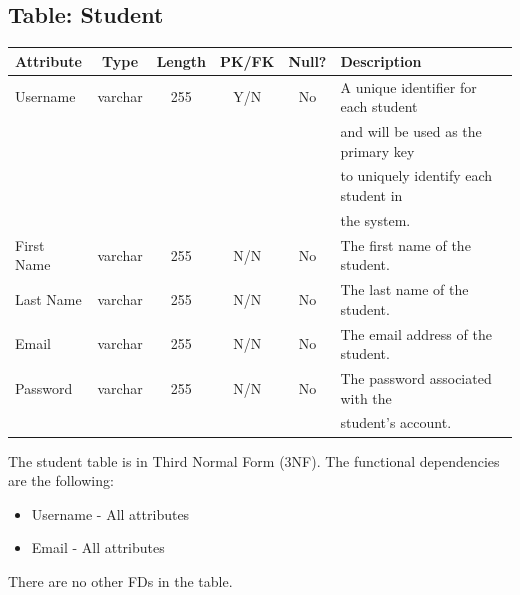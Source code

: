 \documentclass[letterpaper,12pt,oneside,listof=totoc]{scrreprt}
\begin{document}
\subsection{Table: Student}
\begin{table}[h]
    \centering
    \begin{tabular}{|l|c|c|c|c|l|}
        \hline
        \textbf{Attribute} & \textbf{Type} & \textbf{Length} & \textbf{PK/FK} & \textbf{Null?} & \textbf{Description}
        \\
        \hline
         Username & varchar & 255 & Y/N & No & A unique identifier for each student \\ &&&&& and will be used as the primary key \\ &&&&& to uniquely identify each student in \\ &&&&& the system.
        \\
        \hline
        First Name & varchar & 255 & N/N & No & The first name of the student.
        \\
        \hline
        Last Name & varchar & 255 & N/N & No & The last name of the student.
        \\
        \hline
        Email & varchar & 255 & N/N & No & The email address of the student. 
        \\
        \hline
        Password & varchar & 255 & N/N & No & The password associated with the \\ &&&&& student's account.
        \\
        \hline
    \end{tabular}
\end{table}

The student table is in Third Normal Form (3NF). The functional dependencies are the following:
\begin{itemize}
  \item Username - All attributes
  \item Email - All attributes
\end{itemize}
There are no other FDs in the table.
\end{document}
